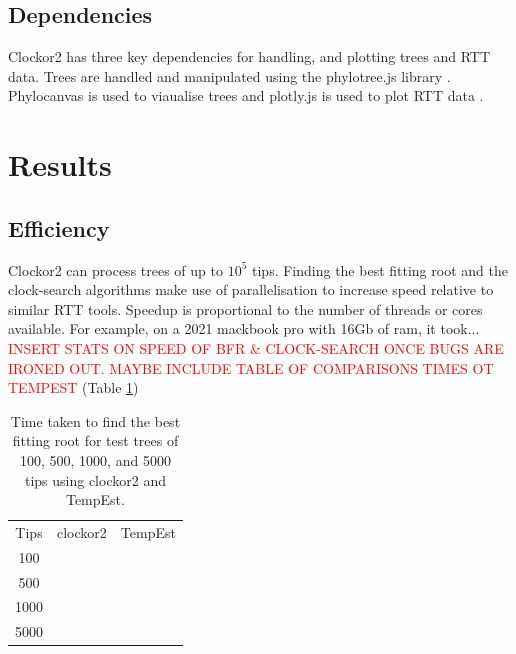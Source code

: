 \documentclass{article}
\begin{document}
\subsection*{Dependencies}
Clockor2 has three key dependencies for handling, and plotting trees and RTT data. Trees are handled and manipulated using the phylotree.js library \citep{shank_phylotreejs_2018}. Phylocanvas is used to viaualise trees and plotly.js is used to plot RTT data \citep{abudahab_phylocanvasgl_2021}.



\section*{Results}
\subsection*{Efficiency}
Clockor2 can process trees of up to $10^5$ tips. Finding the best fitting root and the clock-search algorithms make use of parallelisation to increase speed relative to similar RTT tools. Speedup is proportional to the number of threads or cores available. For example, on a 2021 mackbook pro with 16Gb of ram, it took... \textcolor{red}{INSERT STATS ON SPEED OF BFR & CLOCK-SEARCH ONCE BUGS ARE IRONED OUT. MAYBE INCLUDE TABLE OF COMPARISONS TIMES OT TEMPEST} (Table \ref{tab:bfr})

\begin{table}[H]
    \centering
    \begin{tabular}{c|c|c}
        Tips & clockor2 & TempEst \\
        100 &   & \\
        500 &   & \\
        1000 &   & \\
        5000 &   & \\
    \end{tabular}
    \caption{Time taken to find the best fitting root for test trees of 100, 500, 1000, and 5000 tips using clockor2 and TempEst.}
    \label{tab:bfr}
\end{table}
\end{document}
